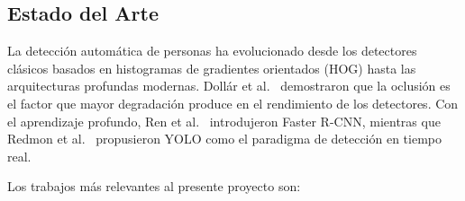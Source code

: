 \subsection{Estado del Arte}

La detecci\'on autom\'atica de personas ha evolucionado desde los
detectores cl\'asicos basados en histogramas de gradientes
orientados (HOG) hasta las arquitecturas profundas modernas.
Doll\'ar et al.~\cite{Dollar2012} demostraron que la oclusi\'on es
el factor que mayor degradaci\'on produce en el rendimiento de los
detectores. Con el aprendizaje profundo, Ren et al.~\cite{Ren2015}
introdujeron Faster R-CNN, mientras que Redmon et
al.~\cite{Redmon2016} propusieron YOLO como el paradigma de
detecci\'on en tiempo real.

Los trabajos m\'as relevantes al presente proyecto son:

